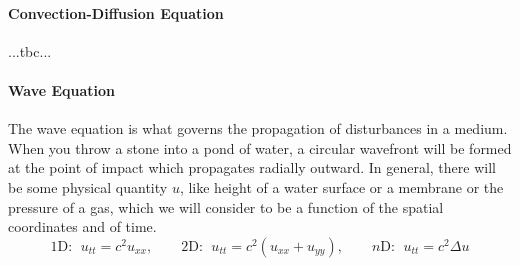 

\paragraph{Convection-Diffusion Equation} ...tbc...



\paragraph{Wave Equation}
The wave equation is what governs the propagation of disturbances in a medium. When you throw a stone into a pond of water, a circular wavefront will be formed at the point of impact which propagates radially outward. In general, there will be some physical quantity $u$, like height of a water surface or a membrane or the pressure of a gas, which we will consider to be a function of the spatial coordinates and of time.
\begin{equation}
1\text{D: } \; u_{tt} = c^2 u_{xx} , \qquad 
2\text{D: } \; u_{tt} = c^2 (u_{xx} + u_{yy}), \qquad 
n\text{D: } \; u_{tt} = c^2 \Delta u
\end{equation}








